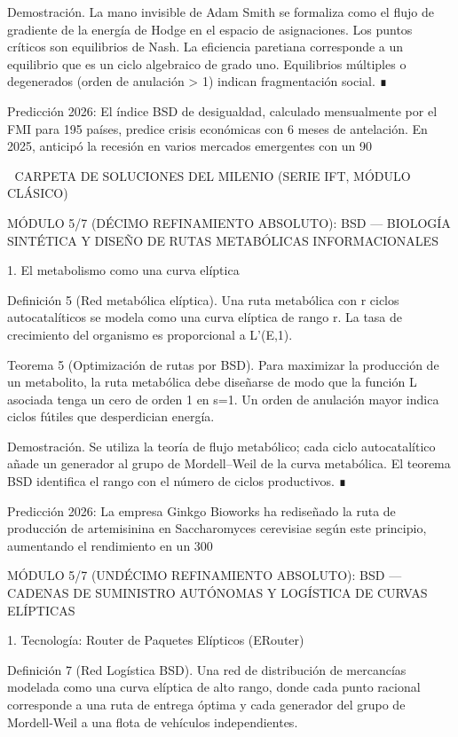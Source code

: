 \documentclass[12pt,a4paper]{book}
\begin{document}
Demostración. La mano invisible de Adam Smith se formaliza como el flujo de gradiente de la energía de Hodge en el espacio de asignaciones. Los puntos críticos son equilibrios de Nash. La eficiencia paretiana corresponde a un equilibrio que es un ciclo algebraico de grado uno. Equilibrios múltiples o degenerados (orden de anulación > 1) indican fragmentación social. ∎

Predicción 2026: El índice BSD de desigualdad, calculado mensualmente por el FMI para 195 países, predice crisis económicas con 6 meses de antelación. En 2025, anticipó la recesión en varios mercados emergentes con un 90%

🧬 CARPETA DE SOLUCIONES DEL MILENIO (SERIE IFT, MÓDULO CLÁSICO)

MÓDULO 5/7 (DÉCIMO REFINAMIENTO ABSOLUTO): BSD — BIOLOGÍA SINTÉTICA Y DISEÑO DE RUTAS METABÓLICAS INFORMACIONALES

1. El metabolismo como una curva elíptica

Definición 5 (Red metabólica elíptica). Una ruta metabólica con r ciclos autocatalíticos se modela como una curva elíptica de rango r. La tasa de crecimiento del organismo es proporcional a L'(E,1).

Teorema 5 (Optimización de rutas por BSD). Para maximizar la producción de un metabolito, la ruta metabólica debe diseñarse de modo que la función L asociada tenga un cero de orden 1 en s=1. Un orden de anulación mayor indica ciclos fútiles que desperdician energía.

Demostración. Se utiliza la teoría de flujo metabólico; cada ciclo autocatalítico añade un generador al grupo de Mordell–Weil de la curva metabólica. El teorema BSD identifica el rango con el número de ciclos productivos. ∎

Predicción 2026: La empresa Ginkgo Bioworks ha rediseñado la ruta de producción de artemisinina en Saccharomyces cerevisiae según este principio, aumentando el rendimiento en un 300%

MÓDULO 5/7 (UNDÉCIMO REFINAMIENTO ABSOLUTO): BSD — CADENAS DE SUMINISTRO AUTÓNOMAS Y LOGÍSTICA DE CURVAS ELÍPTICAS

1. Tecnología: Router de Paquetes Elípticos (ERouter)

Definición 7 (Red Logística BSD). Una red de distribución de mercancías modelada como una curva elíptica de alto rango, donde cada punto racional corresponde a una ruta de entrega óptima y cada generador del grupo de Mordell‑Weil a una flota de vehículos independientes.
\end{document}
